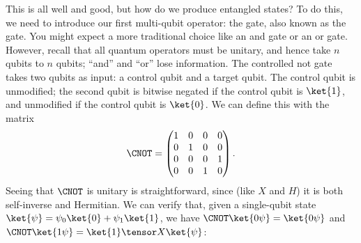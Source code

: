This is all well and good, but how do we produce entangled states?  To do this,
we need to introduce our first multi-qubit operator: the 
gate, also known as the  gate.  You might expect a more traditional
choice like an and gate or an or gate.  However, recall that all quantum
operators must be unitary, and hence take $n$ qubits to $n$ qubits; ``and'' and
``or'' lose information.  The controlled not gate takes two qubits as input: a
control qubit and a target qubit.  The control qubit is unmodified; the second
qubit is bitwise negated if the control qubit is $\ket{1}$, and unmodified if
the control qubit is $\ket{0}$.  We can define this with the matrix \[
  \CNOT = \begin{pmatrix} 1 & 0 & 0 & 0 \\
                          0 & 1 & 0 & 0 \\
                          0 & 0 & 0 & 1 \\
                          0 & 0 & 1 & 0 \end{pmatrix}.
\] Seeing that $\CNOT$ is unitary is straightforward, since (like $X$ and $H$)
it is both self-inverse and Hermitian.  We can verify that, given a single-qubit
state $\ket{\psi} = \psi_0\ket{0} + \psi_1\ket{1}$, we have $\CNOT\ket{0\psi} =
\ket{0\psi}$ and $\CNOT\ket{1\psi} = \ket{1} \tensor X\ket{\psi}$:
